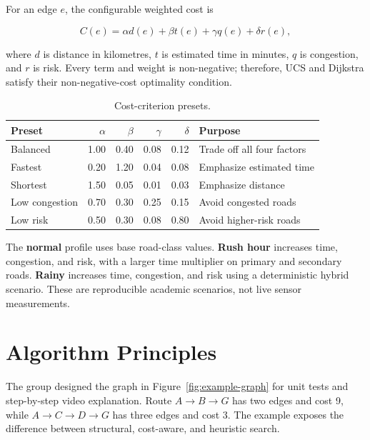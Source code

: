\documentclass[12pt,a4paper]{article}
\begin{document}
For an edge $e$, the configurable weighted cost is

\begin{equation}
    C(e)=\alpha d(e)+\beta t(e)+\gamma q(e)+\delta r(e),
    \label{eq:cost}
\end{equation}

where $d$ is distance in kilometres, $t$ is estimated time in minutes, $q$ is
congestion, and $r$ is risk. Every term and weight is non-negative; therefore,
UCS and Dijkstra satisfy their non-negative-cost optimality condition.

\begin{table}[H]
    \centering
    \caption{Cost-criterion presets.}
    \label{tab:presets}
    \renewcommand{\arraystretch}{1.12}
    \small
    \begin{tabularx}{\textwidth}{lrrrrY}
        \toprule
        \textbf{Preset} & $\alpha$ & $\beta$ & $\gamma$ & $\delta$ & \textbf{Purpose} \\
        \midrule
        Balanced & 1.00 & 0.40 & 0.08 & 0.12 & Trade off all four factors \\
        Fastest & 0.20 & 1.20 & 0.04 & 0.08 & Emphasize estimated time \\
        Shortest & 1.50 & 0.05 & 0.01 & 0.03 & Emphasize distance \\
        Low congestion & 0.70 & 0.30 & 0.25 & 0.15 & Avoid congested roads \\
        Low risk & 0.50 & 0.30 & 0.08 & 0.80 & Avoid higher-risk roads \\
        \bottomrule
    \end{tabularx}
\end{table}

The \textbf{normal} profile uses base road-class values. \textbf{Rush hour}
increases time, congestion, and risk, with a larger time multiplier on primary
and secondary roads. \textbf{Rainy} increases time, congestion, and risk using
a deterministic hybrid scenario. These are reproducible academic scenarios,
not live sensor measurements.

\section{Algorithm Principles}

The group designed the graph in Figure~\ref{fig:example-graph} for unit tests
and step-by-step video explanation. Route $A\rightarrow B\rightarrow G$ has two
edges and cost 9, while $A\rightarrow C\rightarrow D\rightarrow G$ has three
edges and cost 3. The example exposes the difference between structural,
cost-aware, and heuristic search.
\end{document}
